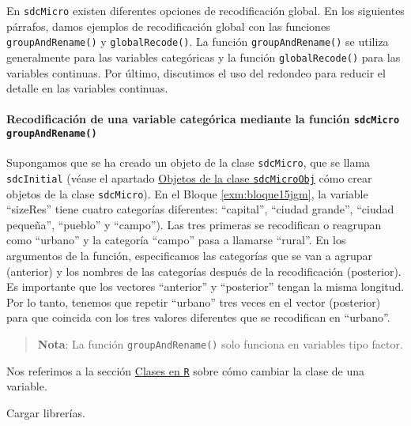 \documentclass[
]{book}
\theoremstyle{definition}
\theoremstyle{definition}
\theoremstyle{definition}
\theoremstyle{definition}
\theoremstyle{remark}
\begin{document}
En \texttt{sdcMicro} existen diferentes opciones de recodificación global. En los siguientes párrafos, damos ejemplos de recodificación global con las funciones \texttt{groupAndRename()} y \texttt{globalRecode()}. La función \texttt{groupAndRename()} se utiliza generalmente para las variables categóricas y la función \texttt{globalRecode()} para las variables continuas. Por último, discutimos el uso del redondeo para reducir el detalle en las variables continuas.

\hypertarget{recodificaciuxf3n-de-una-variable-categuxf3rica-mediante-la-funciuxf3n-sdcmicro-groupandrename}{%
\paragraph{\texorpdfstring{Recodificación de una variable categórica mediante la función \texttt{sdcMicro} \texttt{groupAndRename()}}{Recodificación de una variable categórica mediante la función sdcMicro groupAndRename()}}\label{recodificaciuxf3n-de-una-variable-categuxf3rica-mediante-la-funciuxf3n-sdcmicro-groupandrename}}

Supongamos que se ha creado un objeto de la clase \texttt{sdcMicro}, que se llama \texttt{sdcInitial} (véase el apartado \protect\hyperlink{objetos-de-la-clase-sdcmicroobj}{Objetos de la clase \texttt{sdcMicroObj}} cómo crear objetos de la clase \texttt{sdcMicro}). En el Bloque \ref{exm:bloque15jgm}, la variable ``sizeRes'' tiene cuatro categorías diferentes: ``capital'', ``ciudad grande'', ``ciudad pequeña'', ``pueblo'' y ``campo''). Las tres primeras se recodifican o reagrupan como ``urbano'' y la categoría ``campo'' pasa a llamarse ``rural''. En los argumentos de la función, especificamos las categorías que se van a agrupar (anterior) y los nombres de las categorías después de la recodificación (posterior). Es importante que los vectores ``anterior'' y ``posterior'' tengan la misma longitud. Por lo tanto, tenemos que repetir ``urbano'' tres veces en el vector (posterior) para que coincida con los tres valores diferentes que se recodifican en ``urbano''.

\begin{quote}
\textbf{Nota}: La función \texttt{groupAndRename()} solo funciona en variables tipo factor.
\end{quote}

Nos referimos a la sección \protect\hyperlink{clases-en-r}{Clases en \texttt{R}} sobre cómo cambiar la clase de una variable.

Cargar librerías.
\end{document}
